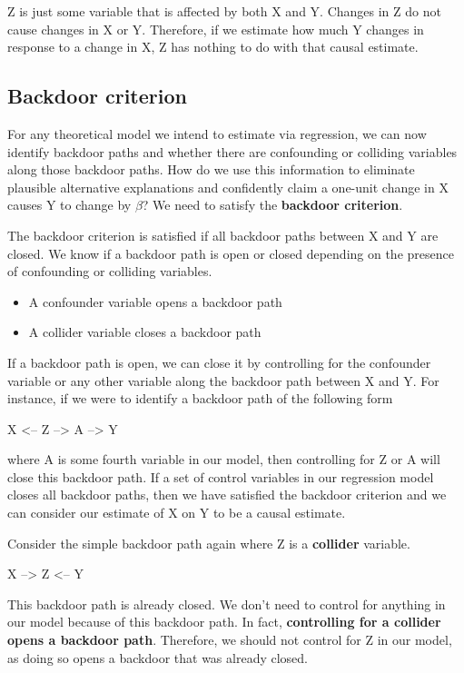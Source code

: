 \documentclass[
]{book}
\providecommand{\tightlist}{%
  \setlength{\itemsep}{0pt}\setlength{\parskip}{0pt}}
\begin{document}
Z is just some variable that is affected by both X and Y. Changes in Z do not cause changes in X or Y. Therefore, if we estimate how much Y changes in response to a change in X, Z has nothing to do with that causal estimate.

\hypertarget{backdoor-criterion}{%
\subsection{Backdoor criterion}\label{backdoor-criterion}}

For any theoretical model we intend to estimate via regression, we can now identify backdoor paths and whether there are confounding or colliding variables along those backdoor paths. How do we use this information to eliminate plausible alternative explanations and confidently claim a one-unit change in X causes Y to change by \(\beta\)? We need to satisfy the \textbf{backdoor criterion}.

The backdoor criterion is satisfied if all backdoor paths between X and Y are closed. We know if a backdoor path is open or closed depending on the presence of confounding or colliding variables.

\begin{itemize}
\tightlist
\item
  A confounder variable opens a backdoor path
\item
  A collider variable closes a backdoor path
\end{itemize}

If a backdoor path is open, we can close it by controlling for the confounder variable or any other variable along the backdoor path between X and Y. For instance, if we were to identify a backdoor path of the following form

X \textless-- Z --\textgreater{} A --\textgreater{} Y

where A is some fourth variable in our model, then controlling for Z or A will close this backdoor path. If a set of control variables in our regression model closes all backdoor paths, then we have satisfied the backdoor criterion and we can consider our estimate of X on Y to be a causal estimate.

Consider the simple backdoor path again where Z is a \textbf{collider} variable.

X --\textgreater{} Z \textless-- Y

This backdoor path is already closed. We don't need to control for anything in our model because of this backdoor path. In fact, \textbf{controlling for a collider opens a backdoor path}. Therefore, we should not control for Z in our model, as doing so opens a backdoor that was already closed.
\end{document}
